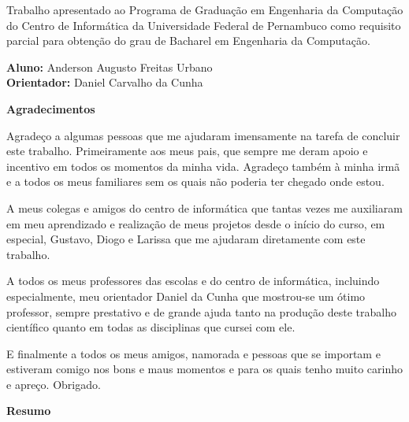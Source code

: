 \documentclass[12pt]{article}
\begin{document}
    \begin{addmargin}[10em]{0em}
    \large
    Trabalho apresentado ao Programa de Graduação em Engenharia da Computação do Centro de Informática da Universidade Federal de Pernambuco como requisito parcial para obtenção do grau de Bacharel em Engenharia da Computação.
    \end{addmargin}
   
    \vskip5cm
   
    \begin{flushleft}
    \large{\textbf{Aluno: }Anderson Augusto Freitas Urbano}\\
    \large{\textbf{Orientador: }Daniel Carvalho da Cunha}
    \end{flushleft}     
    
    \newpage
    \thispagestyle{empty}
    \begin{center}
    \textbf{\LARGE Agradecimentos}
    \end{center}

    Agradeço a algumas pessoas que me ajudaram imensamente na tarefa de concluir este trabalho. Primeiramente aos meus pais, que sempre me deram apoio e incentivo em todos os momentos da minha vida. Agradeço também à minha irmã e a todos os meus familiares sem os quais não poderia ter chegado onde estou.
    
    A meus colegas e amigos do centro de informática que tantas vezes me auxiliaram em meu aprendizado e realização de meus projetos desde o início do curso, em especial, Gustavo, Diogo e Larissa que me ajudaram diretamente com este trabalho.
    
    A todos os meus professores das escolas e do centro de informática, incluindo especialmente, meu orientador Daniel da Cunha que mostrou-se um ótimo professor, sempre prestativo e de grande ajuda tanto na produção deste trabalho científico quanto em todas as disciplinas que cursei com ele.
    
    E finalmente a todos os meus amigos, namorada e pessoas que se importam e estiveram comigo nos bons e maus momentos e para os quais tenho muito carinho e apreço.
    \vskip3mm
    Obrigado.

    \newpage
    \thispagestyle{empty}
    \begin{center}
    \textbf{\LARGE Resumo}
    \end{center}
\end{document}
